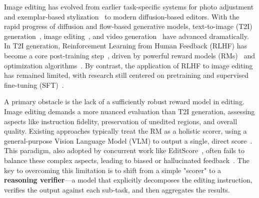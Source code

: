\documentclass{llmxive}
\begin{document}
\begin{CJK*}{UTF8}{gbsn}
Image editing has evolved from earlier task-specific systems for photo adjustment and exemplar-based stylization~\cite{yan2016automatic,zhu2017exemplar,ruiz2023dreambooth,ye2023ip,guo2024real} to modern diffusion-based editors. 
With the rapid progress of diffusion and flow-based generative models, text-to-image (T2I) generation~\citep{ramesh2022hierarchical,saharia2022photorealistic,chang2023muse,balaji2022ediffi,rombach2022high,podell2023sdxl,esser2024scaling,betker2023improving,imagen2024imagen3,chen2023pixartalpha,chen2024pixartsigma,li2024hunyuandit,zheng2024cogview3,gong2025seedream,gao2025seedream,wu2025qwen,chen2025janus,han2025infinity}, image editing~\citep{brooks2023instructpix2pix,sheynin2024emu,ren2024byteedit,shi2024seededit,wang2025seededit,liu2025step1x,batifol2025flux,xiao2025omnigen}, and video generation~\citep{blattmann2023stable,bartal2024lumiere,brooks2024video,bao2024vidu,kong2024hunyuanvideo,moviegen2024movie,yang2025cogvideox,hacohen2025ltx,seawead2025seaweed,ma2025step,wan2025wan,gao2025seedance,seedance2025seedance,seedance2026seedance} have advanced dramatically.
In T2I generation, Reinforcement Learning from Human Feedback (RLHF) has become a core post-training step~\citep{gong2025seedream,gao2025seedream,wu2025qwen}, driven by powerful reward models (RMs)~\citep{xu2023imagereward,ma2025hpsv3,wang2025unified} and optimization algorithms~\citep{wallace2024diffusion,xu2023imagereward,xue2025dancegrpo}. By contrast, the application of RLHF to image editing has remained limited, with research still centered on pretraining and supervised fine-tuning (SFT)~\citep{wang2025seededit,deng2025emerging,batifol2025flux}.

A primary obstacle is the lack of a sufficiently robust reward model in editing. Image editing demands a more nuanced evaluation than T2I generation, assessing aspects like instruction fidelity, preservation of unedited regions, and overall quality. 
Existing approaches typically treat the RM as a holistic scorer, using a general-purpose Vision Language Model (VLM) to output a single, direct score~\citep{gong2025onereward,wei2025skywork}. 
This paradigm, also adopted by concurrent work like EditScore~\citep{luo2025editscore}, often fails to balance these complex aspects, leading to biased or hallucinated feedback~\citep{gunjal2025rubrics}. 
The key to overcoming this limitation is to shift from a simple "scorer" to a \textbf{reasoning verifier}—a model that explicitly decomposes the editing instruction, verifies the output against each sub-task, and then aggregates the results.


\end{CJK*}
\end{document}
